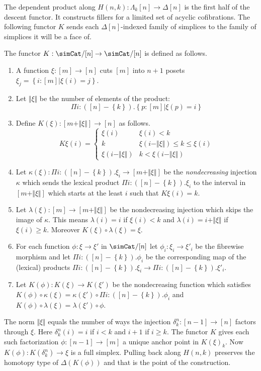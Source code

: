 \documentclass{tac}
\newcommand\set[1]{\left\{#1\right\}}
\newcommand\of{:}
\newcommand\simplex\Delta
\newcommand\horn\Lambda
\newcommand\norm[1]{\Vert #1 \Vert}
\newcommand\ka\kappa
\newcommand\la\lambda
\begin{document}
The dependent product along $H(n,k)\of \horn_k[n]\to\simplex[n]$ is the first half of the descent functor. It constructs fillers for a limited set of acyclic cofibrations. The following functor $K$ sends each $\simplex[n]$-indexed family of simplices to the family of simplices it will be a face of.

\begin{definition}
The functor $K\of\simCat/[n]\to\simCat/[n]$ is defined as follows. 
\begin{enumerate}
\item A function $\xi\of[m]\to[n]$ cuts $[m]$ into $n+1$ posets $\xi_j = \set{i\of[m]|\xi(i)=j}$. 
\item Let $\norm \xi$ be the number of elements of the product: \[\Pi i\of ([n]-\set k).\set{p\of [m]|\xi(p)=i}\] 
\item Define $K(\xi)\of [m+\norm\xi]\to [n]$ as follows.
\[ 
	K\xi(i) = \left\{
		\begin{array}{cc}
			\xi(i) & \xi(i)<k \\
			k & \xi(i-\norm\xi)\leq k \leq \xi(i)\\
			\xi(i-\norm\xi) & k<\xi(i-\norm\xi)
		\end{array}
	\right.
\]
\item Let $\ka(\xi)\of\Pi i\of([n]-\set k).\xi_i \to [m+\norm\xi]$ be the \emph{nondecreasing} injection $\ka$ which sends the lexical product $\Pi i\of([n]-\set k).\xi_i$ to the interval in $[m+\norm\xi]$ which starts at the least $i$ such that $K\xi(i)=k$.
\item Let $\la(\xi)\of[m]\to[m+\norm\xi]$ be the nondecreasing injection which skips the image of $\ka$. This means $\la(i)=i$ if $\xi(i)<k$ and $\la(i)=i+\norm\xi$ if $\xi(i)\geq k$. Moreover $K(\xi)\circ\la(\xi) = \xi$.
\item For each function $\phi\of\xi\to\xi'$ in $\simCat/[n]$ let $\phi_i\of\xi_i\to\xi'_i$ be the fibrewise morphism and let $\Pi i\of([n]-\set k).\phi_i$ be the corresponding map of the (lexical) products $\Pi i\of([n]-\set k).\xi_i\to\Pi i\of([n]-\set k).\xi'_i$.
\item Let $K(\phi)\of K(\xi)\to K(\xi')$ be the nondecreasing function which satisfies $K(\phi)\circ \ka(\xi) = \ka(\xi')\circ \Pi i\of([n]-\set k).\phi_i$ and $K(\phi)\circ \la(\xi) = \la(\xi')\circ \phi$.
\end{enumerate}
\end{definition}

The norm $\norm\xi$ equals the number of ways the injection $\delta^n_k\of[n-1]\to[n]$ factors through $\xi$. Here $\delta^n_k(i)=i$ if $i<k$ and $i+1$ if $i\geq k$. The functor $K$ gives each such factorization $\phi\of[n-1]\to [m]$ a unique anchor point in $K(\xi)_k$. Now $K(\phi)\of K(\delta^n_k)\to \xi$ is a full simplex. Pulling back along $H(n,k)$ preserves the homotopy type of $\Delta(K(\phi))$ and that is the point of the construction.
\end{document}
